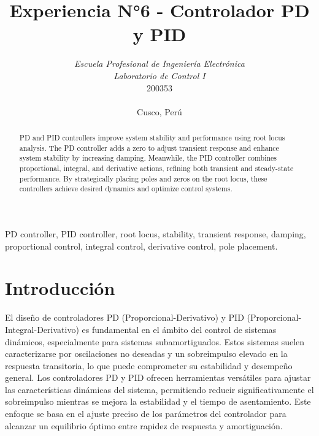\documentclass[conference]{IEEEtran}
\begin{document}
	
	\title{Experiencia N°6 - Controlador PD y PID}
	\author{	
		\textit{Escuela Profesional de Ingeniería Electrónica}\\
		\textit{Laboratorio de Control I}\\
		200353 \\\\
		Cusco, Perú
	}
	
	\maketitle
	
	\begin{abstract}
		PD and PID controllers improve system stability and performance using root locus analysis. The PD controller adds a zero to adjust transient response and enhance system stability by increasing damping. Meanwhile, the PID controller combines proportional, integral, and derivative actions, refining both transient and steady-state performance. By strategically placing poles and zeros on the root locus, these controllers achieve desired dynamics and optimize control systems.
	\end{abstract}
	
	\begin{IEEEkeywords}
		PD controller, PID controller, root locus, stability, transient response, damping, proportional control, integral control, derivative control, pole placement.
	\end{IEEEkeywords}
	
	\section{Introducción}
		El diseño de controladores PD (Proporcional-Derivativo) y PID (Proporcional-Integral-Derivativo) es fundamental en el ámbito del control de sistemas dinámicos, especialmente para sistemas subamortiguados. Estos sistemas suelen caracterizarse por oscilaciones no deseadas y un sobreimpulso elevado en la respuesta transitoria, lo que puede comprometer su estabilidad y desempeño general. Los controladores PD y PID ofrecen herramientas versátiles para ajustar las características dinámicas del sistema, permitiendo reducir significativamente el sobreimpulso mientras se mejora la estabilidad y el tiempo de asentamiento. Este enfoque se basa en el ajuste preciso de los parámetros del controlador para alcanzar un equilibrio óptimo entre rapidez de respuesta y amortiguación.
		
\end{document}
